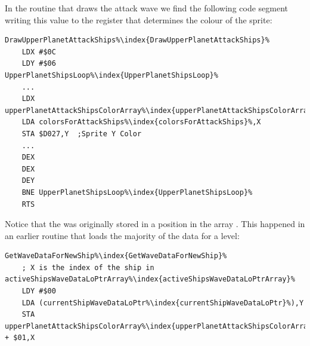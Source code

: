 In the routine that draws the attack wave we find the following code segment writing this value
to the register  that determines the colour of the sprite:

\begin{lstlisting}[escapechar=\%]
DrawUpperPlanetAttackShips%\index{DrawUpperPlanetAttackShips}%
    LDX #$0C
    LDY #$06
UpperPlanetShipsLoop%\index{UpperPlanetShipsLoop}%   
    ...
    LDX upperPlanetAttackShipsColorArray%\index{upperPlanetAttackShipsColorArray}%,Y
    LDA colorsForAttackShips%\index{colorsForAttackShips}%,X
    STA $D027,Y  ;Sprite Y Color
    ...
    DEX
    DEX
    DEY
    BNE UpperPlanetShipsLoop%\index{UpperPlanetShipsLoop}%
    RTS
\end{lstlisting}

Notice that the  was originally stored in a position in the array .
This happened in an earlier routine that loads the majority of the data for a level:


\begin{lstlisting}[escapechar=\%]
GetWaveDataForNewShip%\index{GetWaveDataForNewShip}%
    ; X is the index of the ship in activeShipsWaveDataLoPtrArray%\index{activeShipsWaveDataLoPtrArray}%
    LDY #$00
    LDA (currentShipWaveDataLoPtr%\index{currentShipWaveDataLoPtr}%),Y
    STA upperPlanetAttackShipsColorArray%\index{upperPlanetAttackShipsColorArray}% + $01,X
\end{lstlisting}

